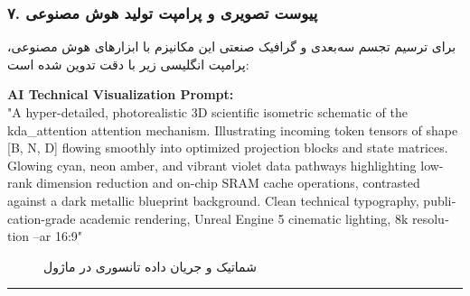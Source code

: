 \subsubsection*{۷. پیوست تصویری و پرامپت تولید هوش مصنوعی}
برای ترسیم تجسم سه‌بعدی و گرافیک صنعتی این مکانیزم با ابزارهای هوش مصنوعی، پرامپت انگلیسی زیر با دقت تدوین شده است:

\vspace{0.2cm}
\begin{latin}
\footnotesize
\textbf{AI Technical Visualization Prompt:}\\
"A hyper-detailed, photorealistic 3D scientific isometric schematic of the kda\_attention attention mechanism. Illustrating incoming token tensors of shape [B, N, D] flowing smoothly into optimized projection blocks and state matrices. Glowing cyan, neon amber, and vibrant violet data pathways highlighting low-rank dimension reduction and on-chip SRAM cache operations, contrasted against a dark metallic blueprint background. Clean technical typography, publication-grade academic rendering, Unreal Engine 5 cinematic lighting, 8k resolution --ar 16:9"
\end{latin}

\begin{figure}[H]
    \centering
    \caption{شماتیک و جریان داده تانسوری در ماژول }
    \label{fig:kda_attention}
\end{figure}

\vspace{0.5cm}
\hrule
\vspace{0.5cm}
